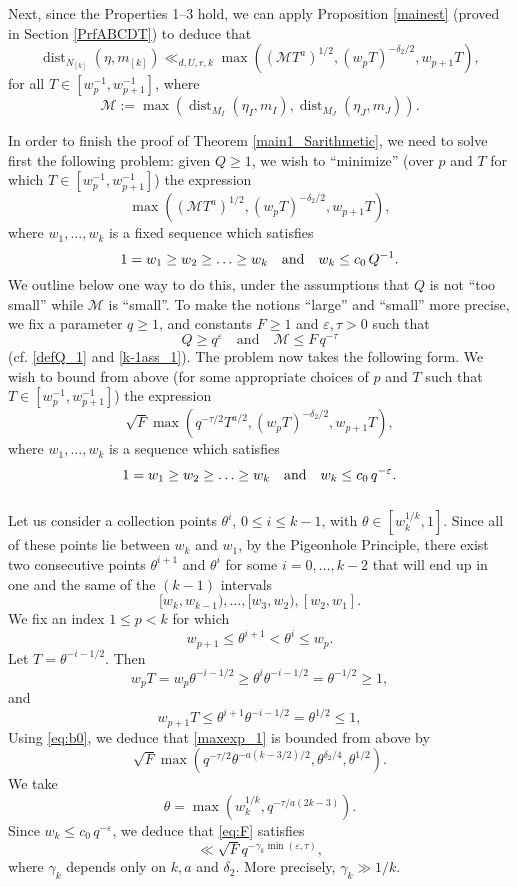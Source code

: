 \documentclass[11pt,reqno,a4paper]{amsart}
\numberwithin{equation}{section}
\newcommand{\qand}{\quad \textrm{and} \quad}
\newcommand{\eps}{\varepsilon}
\DeclareMathOperator{\dist}{dist}
\theoremstyle{theorem}
\theoremstyle{definition}
\begin{document}
Next, since the Properties 1--3 hold, we can apply Proposition \ref{mainest} (proved in Section \ref{PrfABCDT}) to deduce that
$$
	\dist_{N_{[k]}}(\eta,m_{[k]}) \ll_{d,U,r,k} \max((\mathcal{M}T^a)^{1/2},(w_p T)^{-\delta_2/2},w_{p+1} T),
$$
	for all $T \in [w_p^{-1}, w_{p+1}^{-1}]$, where
	\[
	\mathcal{M} := \max(\dist_{M_I}(\eta_I,m_I),\dist_{M_J}(\eta_J,m_J)).
	\]
	
In order to finish the proof of Theorem \ref{main1_Sarithmetic},
we need to solve first the following problem: given $Q \geq 1$, we wish to ``minimize'' (over $p$ and $T$ for
which $T\in [w_p^{-1},w_{p+1}^{-1}]$) the 
expression
\[
\max((\mathcal{M}T^a)^{1/2}, (w_p T)^{-\delta_2/2}, w_{p+1} T),
\]
where $w_1,\ldots,w_k$ is a fixed sequence which satisfies
\[
1 = w_1 \geq w_2 \geq \ldots \geq w_k\quad\hbox{and}\quad w_k\le c_0\,Q^{-1}.
\]
We outline below one way to do this, under the assumptions
that $Q$ is not ``too small'' while
$\mathcal{M}$ is ``small''.
To make the notions ``large'' and ``small'' more precise, we fix a parameter $q \geq 1$, and constants $F \geq 1$ and $\eps, \tau > 0$ 
such that
\[
Q \geq q^{\eps} \qand \mathcal{M} \leq F\, q^{-\tau}
\]
(cf. \eqref{defQ_1} and \eqref{k-1ass_1}).
The problem now takes the following form. We wish to bound from above (for some appropriate choices of 
$p$ and $T$ such that $T\in [w_p^{-1}, w_{p+1}^{-1}]$) the expression
\begin{equation}
	\label{maxexp_1}
	\sqrt{F} \max(q^{-\tau/2} T^{a/2}, (w_p T)^{-\delta_2/2}, w_{p+1} T),
\end{equation}
where $w_1,\ldots,w_k$ is a sequence which satisfies
\[
1 = w_1 \geq w_2 \geq \ldots \geq w_k\quad \hbox{and}\quad w_k\leq c_0\,q^{-\eps}.
\]\\

Let us consider a collection points $\theta^i$, $0\le i\le k-1$,
with $\theta\in [w_k^{1/k},1]$.
Since all of these points lie between $w_k$ and $w_1$,
by the Pigeonhole Principle, there exist two consecutive points 
$\theta^{i+1}$ and $\theta^i$ for some $i=0,\ldots, k-2$ that will end up in one and the same 
of the $(k-1)$ intervals
\[
[w_k,w_{k-1}), \ldots, [w_3,w_2), [w_2,w_1].
\]
We fix an index $1 \leq p < k$ for which
\begin{equation}
\label{eq:b0}
w_{p+1} \leq \theta^{i+1}<\theta^i \leq w_p.
\end{equation}
Let $T = \theta^{-i-1/2}$. Then 
\[
w_p T = w_p \theta^{-i-1/2}  \geq \theta^i  \theta^{-i-1/2}  = \theta^{-1/2} \geq 1,
\]
and 
\[
w_{p+1} T \leq \theta^{i+1}  \theta^{-i-1/2}  = \theta^{1/2} \leq 1,
\]
Using \eqref{eq:b0}, we deduce that  \eqref{maxexp_1} is bounded from above by
\begin{equation}
\label{eq:F}
\sqrt{F} \max(q^{-\tau/2} \theta^{-a(k-3/2)/2}, \theta^{\delta_2/4}, \theta^{1/2}).
\end{equation}
We take
$$
\theta=\max\left(w_k^{1/k}, q^{-\tau/a(2k-3)}\right).
$$
Since $w_k \le c_0\,q^{-\eps}$, we deduce that \eqref{eq:F}
satisfies
$$
\ll \sqrt{F} q^{-\gamma_k \min(\eps,\tau) },
$$
where $\gamma_k$ depends only on $k, a$ and $\delta_2$.
More precisely, $\gamma_k\gg 1/k$.\\
\end{document}
